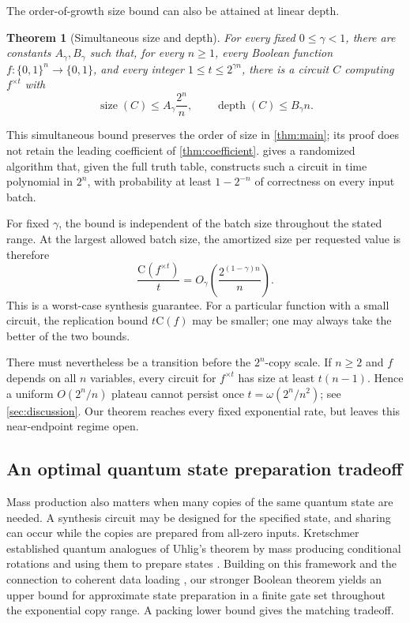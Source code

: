 \documentclass[11pt]{article}
\newtheorem{theorem}{Theorem}[section]
\newcommand{\bits}{\{0,1\}}
\newcommand{\C}{\mathrm{C}}
\begin{document}
The order-of-growth size bound can also be attained at linear depth.

\begin{theorem}[Simultaneous size and depth]\label{thm:linear-depth}
For every fixed $0\le\gamma<1$, there are constants $A_\gamma,B_\gamma$
such that, for every $n\ge1$, every Boolean function $f:\bits^n\to\bits$,
and every integer $1\le t\le2^{\gamma n}$, there is a circuit $C$ computing
$f^{\times t}$ with
\[
  \operatorname{size}(C)\le A_\gamma\frac{2^n}{n},
  \qquad
  \operatorname{depth}(C)\le B_\gamma n.
\]
\end{theorem}

This simultaneous bound preserves the order of size in \cref{thm:main};
its proof does not retain the leading coefficient of \cref{thm:coefficient}.
 gives a randomized algorithm that,
given the full truth table, constructs such a circuit in time polynomial
in $2^n$, with probability at least $1-2^{-n}$ of correctness on every
input batch.

For fixed $\gamma$, the bound is independent of the batch size throughout
the stated range.  At the largest allowed batch size, the amortized size per
requested value is therefore
\[
  \frac{\C(f^{\times t})}{t}
  =O_\gamma\!\left(\frac{2^{(1-\gamma)n}}{n}\right).
\]
This is a worst-case synthesis guarantee.  For a particular function with a
small circuit, the replication bound $t\C(f)$ may be smaller; one may always
take the better of the two bounds.

There must nevertheless be a transition before the $2^n$-copy scale.  If
$n\ge2$ and $f$ depends on all $n$ variables, every circuit for
$f^{\times t}$ has size at least $t(n-1)$.  Hence a uniform $O(2^n/n)$ plateau
cannot persist once $t=\omega(2^n/n^2)$; see \cref{sec:discussion}.  Our
theorem reaches every fixed exponential rate, but leaves this near-endpoint
regime open.

\subsection{An optimal quantum state preparation tradeoff}

Mass production also matters when many copies of the same quantum state
are needed.  A synthesis circuit may be designed for the specified state,
and sharing can occur while the copies are prepared from all-zero inputs.
Kretschmer established quantum analogues of Uhlig's theorem by mass
producing conditional rotations and using them to prepare states
\cite{Kretschmer2023}.  Building on this framework and the connection to
coherent data loading \cite{HugginsKhattarWiebe2025}, our stronger Boolean
theorem yields an upper bound for approximate state preparation in a finite
gate set throughout the exponential copy range.  A packing lower bound
gives the matching tradeoff.
\end{document}
